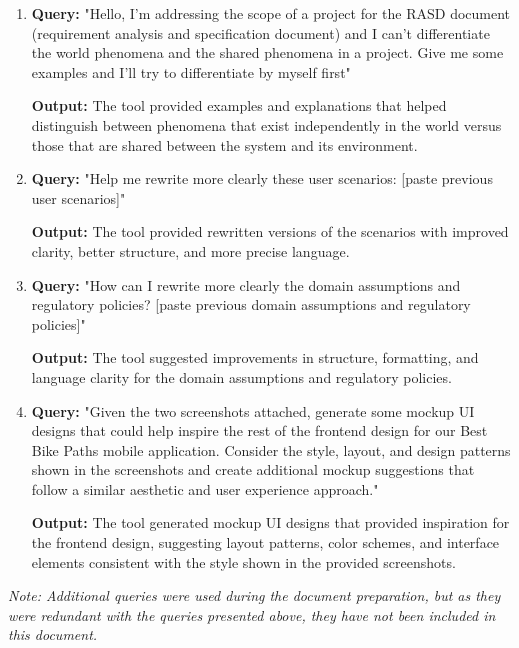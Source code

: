 \begin{enumerate}
    \item \textbf{Query:} "Hello, I'm addressing the scope of a project for the RASD document (requirement analysis and specification document) and I can't differentiate the world phenomena and the shared phenomena in a project. Give me some examples and I'll try to differentiate by myself first"
    
    \textbf{Output:} The tool provided examples and explanations that helped distinguish between phenomena that exist independently in the world versus those that are shared between the system and its environment.
    
    \item \textbf{Query:} "Help me rewrite more clearly these user scenarios: [paste previous user scenarios]"
    
    \textbf{Output:} The tool provided rewritten versions of the scenarios with improved clarity, better structure, and more precise language.
    
    \item \textbf{Query:} "How can I rewrite more clearly the domain assumptions and regulatory policies? [paste previous domain assumptions and regulatory policies]"
    
    \textbf{Output:} The tool suggested improvements in structure, formatting, and language clarity for the domain assumptions and regulatory policies.
    
    \item \textbf{Query:} "Given the two screenshots attached, generate some mockup UI designs that could help inspire the rest of the frontend design for our Best Bike Paths mobile application. Consider the style, layout, and design patterns shown in the screenshots and create additional mockup suggestions that follow a similar aesthetic and user experience approach."
    
    \textbf{Output:} The tool generated mockup UI designs that provided inspiration for the frontend design, suggesting layout patterns, color schemes, and interface elements consistent with the style shown in the provided screenshots.
\end{enumerate}

\vspace{0.3cm}
\textit{Note: Additional queries were used during the document preparation, but as they were redundant with the queries presented above, they have not been included in this document.}

